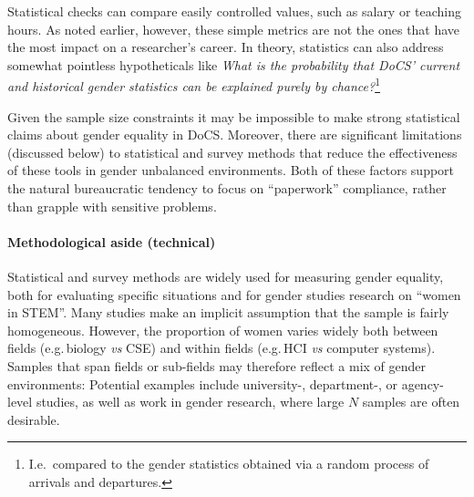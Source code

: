 \documentclass[a4paper,10pt,twocolumn]{article}
\begin{document}
Statistical checks can compare easily controlled values, such as
salary or teaching hours.  As noted earlier, however, these simple
metrics are not the ones that have the most impact on a researcher's
career.  In theory, statistics can also address somewhat pointless
hypotheticals like \emph{What is the probability that DoCS' current
and historical gender statistics can be explained purely by
chance?}\footnote{I.e.\ compared to the gender statistics obtained via
a random process of arrivals and departures.}


Given the sample size constraints it may be impossible to make strong
statistical claims about gender equality in DoCS.  Moreover, there are
significant limitations (discussed below) to statistical and survey
methods that reduce the effectiveness of these tools in gender
unbalanced environments.  Both of these factors support the natural
bureaucratic tendency to focus on ``paperwork'' compliance, rather
than grapple with sensitive problems.

\paragraph*{Methodological aside (technical)} Statistical and survey methods are
widely used for measuring gender equality, both for evaluating
specific situations and for gender studies research on ``women in
STEM''.  Many studies make an implicit assumption that the sample is
fairly homogeneous.  However, the proportion of women varies widely
both between fields (e.g.\,biology \emph{vs} CSE) and within fields
(e.g.\,HCI \emph{vs} computer systems).  Samples that span fields or
sub-fields may therefore reflect a mix of gender environments:
Potential examples include university-, department-, or agency-level
studies, as well as work in gender research, where large $N$ samples
are often desirable.
\end{document}
